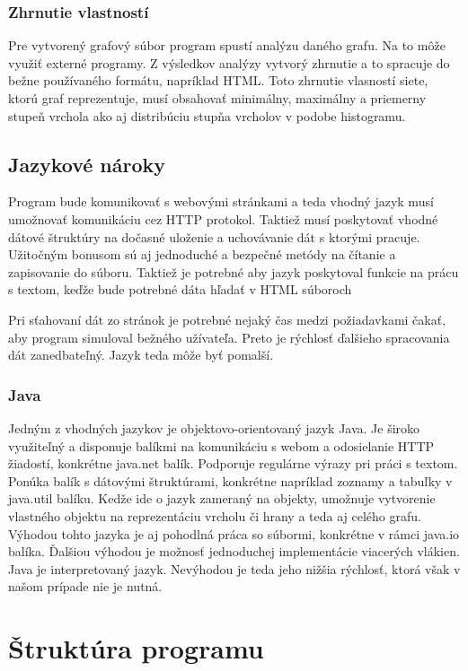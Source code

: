 \documentclass[12pt,twoside,slovak,a4paper]{article}
\begin{document}
\subsubsection{Zhrnutie vlastností}
Pre vytvorený grafový súbor program spustí analýzu daného grafu. Na to môže využiť externé programy. Z výsledkov analýzy vytvorý zhrnutie a to spracuje do bežne používaného formátu, napríklad HTML. Toto zhrnutie vlasností siete, ktorú graf reprezentuje, musí obsahovať minimálny, maximálny a priemerny stupeň vrchola ako aj distribúciu stupňa vrcholov v podobe histogramu.
\subsection{Jazykové nároky}
Program bude komunikovať s webovými stránkami a teda vhodný jazyk musí umožnovať komunikáciu cez HTTP protokol. Taktiež musí poskytovať vhodné dátové štruktúry na dočasné uloženie a uchovávanie dát s ktorými pracuje. Užitočným bonusom sú aj jednoduché a bezpečné metódy na čítanie a zapisovanie do súboru. Taktiež je potrebné aby jazyk poskytoval funkcie na prácu s textom, keďže bude potrebné dáta hľadať v HTML súboroch

Pri sťahovaní dát zo stránok je potrebné nejaký čas medzi požiadavkami čakať, aby program simuloval bežného užívateľa. Preto je rýchlosť ďalšieho spracovania dát zanedbateľný. Jazyk teda môže byť pomalší.
\subsubsection{Java}
Jedným z vhodných jazykov je objektovo-orientovaný jazyk Java. Je široko využiteľný a disponuje balíkmi na komunikáciu s webom a odosielanie HTTP žiadostí, konkrétne java.net balík. Podporuje regulárne výrazy pri práci s textom. Ponúka balík s dátovými štruktúrami, konkrétne napríklad zoznamy a tabuľky v java.util balíku. Kedže ide o jazyk zameraný na objekty, umožnuje vytvorenie vlastného objektu na reprezentáciu vrcholu či hrany a teda aj celého grafu. Výhodou tohto jazyka je aj pohodlná práca so súbormi, konkrétne v rámci java.io balíka. Ďalšiou výhodou je možnosť jednoduchej implementácie viacerých vlákien. 
	Java je interpretovaný jazyk. Nevýhodou je teda jeho nižšia rýchlosť, ktorá však v našom prípade nie je nutná.

\section{Štruktúra programu}
\end{document}

